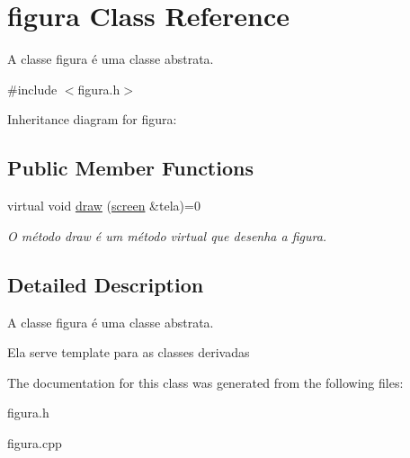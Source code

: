 \hypertarget{classfigura}{}\section{figura Class Reference}
\label{classfigura}


A classe figura é uma classe abstrata.  




{\ttfamily \#include $<$figura.\+h$>$}



Inheritance diagram for figura\+:
\subsection*{Public Member Functions}
\begin{DoxyCompactItemize}
\item 
virtual void \hyperlink{classfigura_afc03801ba268364f556705d831b110ae}{draw} (\hyperlink{classscreen}{screen} \&tela)=0\hypertarget{classfigura_afc03801ba268364f556705d831b110ae}{}\label{classfigura_afc03801ba268364f556705d831b110ae}

\begin{DoxyCompactList}\small\item\em O método draw é um método virtual que desenha a figura. \end{DoxyCompactList}\end{DoxyCompactItemize}


\subsection{Detailed Description}
A classe figura é uma classe abstrata. 

Ela serve template para as classes derivadas 

The documentation for this class was generated from the following files\+:\begin{DoxyCompactItemize}
\item 
figura.\+h\item 
figura.\+cpp\end{DoxyCompactItemize}

